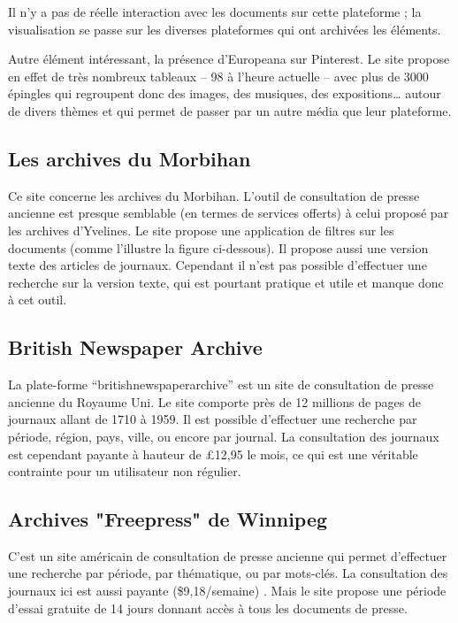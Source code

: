         Il n’y a pas de réelle interaction avec les documents sur cette plateforme ;
        la visualisation se passe sur les diverses plateformes qui ont archivées les éléments.

        Autre élément intéressant, la présence d’Europeana sur Pinterest.
        Le site propose en effet de très nombreux tableaux – 98 à l’heure actuelle – avec plus de 3000 épingles qui regroupent
        donc des images, des musiques, des expositions… autour de divers thèmes et qui permet de passer par un autre média que leur plateforme.


        \subsection{Les archives du Morbihan}
        \label{subsec:morbihan}
        Ce site concerne les archives du Morbihan. L’outil de consultation de presse ancienne est presque semblable
        (en termes de services offerts) à celui proposé par les archives d’Yvelines. Le site propose une application
        de filtres sur les documents (comme l’illustre la figure ci-dessous). Il propose aussi une version texte
        des articles de journaux. Cependant il n’est pas possible d’effectuer une recherche sur la version texte,
        qui est pourtant pratique et utile et manque donc à cet outil.

        \subsection{British Newspaper Archive}
        \label{subsec:britishnewspaper}
        La plate-forme “britishnewspaperarchive” est un site de consultation de presse ancienne du Royaume Uni.
        Le site comporte près de 12 millions de pages de journaux allant de 1710 à 1959. Il est possible
        d’effectuer une recherche par période, région, pays, ville, ou encore par journal. La consultation
        des journaux est cependant payante à hauteur de £12,95 le mois, ce qui est une véritable contrainte
        pour un utilisateur non régulier.

        \subsection{Archives "Freepress" de Winnipeg}
        \label{subsec:winnipeg}
        C’est un site américain de consultation de presse ancienne qui permet d’effectuer une recherche par période,
        par thématique, ou par mots-clés. La consultation des journaux ici est aussi payante
        (\$9,18/semaine) . Mais le site propose une période d’essai gratuite de 14 jours donnant accès à tous les documents de presse.


